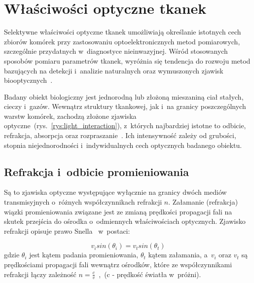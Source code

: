 \renewcommand{\figurename}{Rys.}

\chapter{Właściwości optyczne tkanek}
\label{cha:WlasciowosciOptyczne}

\fontsize{14}{15}\selectfont

Selektywne właściwości optyczne tkanek umożliwiają określanie istotnych cech zbiorów komórek przy zastosowaniu
optoelektronicznych metod pomiarowych, szczególnie przydatnych w~diagnostyce nieinwazyjnej. Wśród stosowanych sposobów 
pomiaru parametrów tkanek, wyróżnia się tendencja do rozwoju metod bazujących na detekcji i~analizie naturalnych oraz wymuszonych 
zjawisk biooptycznych~\cite{Cys:2007}.

Badany obiekt biologiczny jest jednorodną lub złożoną mieszaniną ciał stałych, cieczy i~gazów. Wewnątrz struktury tkankowej,
jak i~na granicy poszczególnych warstw komórek, zachodzą złożone zjawiska optyczne~(rys.~\ref{rys:light_interaction}), z~których 
najbardziej istotne to odbicie, refrakcja, absorpcja oraz rozpraszanie~\cite{Valisue:Thesis:2011}. Ich intensywność zależy od grubości, 
stopnia niejednorodności i~indywidualnych cech optycznych badanego obiektu.

\section{Refrakcja i~odbicie promieniowania}
\label{sec:refraction}

Są to zjawiska optyczne występujące wyłącznie na granicy dwóch mediów transmisyjnych o~różnych współczynnikach refrakcji $n$. Załamanie (refrakcja) wiązki promieniowania
związane jest ze zmianą prędkości propagacji fali na skutek przejścia do ośrodka o~odmiennych właściwościach optycznych. Zjawisko refrakcji opisuje prawo Snella~\cite{Feyn:2012} 
w~postaci:

\begin{equation}
	v_{i}sin(\theta_{i})=v_{t}sin(\theta_{t})
\end{equation}
gdzie $\theta_{i}$ jest kątem padania promieniowania, $\theta_{t}$ kątem załamania, a~$v_{i}$ oraz $v_{t}$ są prędkościami propagacji fali 
wewnątrz ośrodków, które ze współczynnikami refrakcji łączy zależność $n=\frac{c}{v}$~\cite{Feyn:2012},~(c - prędkość światła w~próżni).\\


